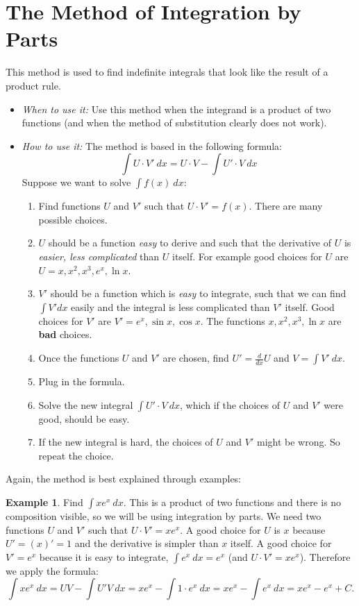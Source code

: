 \documentclass[12pt]{article}
\theoremstyle{definition}
\newtheorem{exa}[thm]{Example}
\begin{document}
\section*{The Method of Integration by Parts}

This method is used to find indefinite integrals that look like the result of a product rule.

\begin{itemize}
\item {\it When to use it:} Use this method when the integrand is a product of two functions (and when the method of
substitution clearly does not work).

\item {\it How to use it:} The method is based in the following formula:
$$\int U\cdot V' \ dx = U \cdot V - \int U' \cdot V \ dx $$
Suppose we want to solve $\int f(x) \ dx$:
\begin{enumerate}
\item Find functions $U$ and $V'$ such that $U\cdot V' = f(x)$. There are many possible choices.
\item $U$ should be a function {\it easy} to derive and such that the derivative of $U$ is {\it easier, less complicated}
than $U$ itself. For example good choices for $U$ are $U=x, x^2, x^3, e^x,\ln x$.
\item $V'$ should be a function which is {\it easy} to integrate, such that we can find $\int V' dx$ easily and the integral
is less complicated than $V'$ itself. Good choices
for $V'$ are $V'=e^x, \sin x, \cos x$. The functions $x, x^2, x^3 , \ln x$ are {\bf bad} choices.
\item Once the functions $U$ and $V'$ are chosen, find $U' =\frac{d}{dx}U$ and $V=\int V' \ dx$.
\item Plug in the formula.
\item Solve the new integral $\int U' \cdot V \ dx$, which if the choices of $U$ and $V'$ were good, should be easy.
\item If the new integral is hard, the choices of $U$ and $V'$ might be wrong. So repeat the choice.
\end{enumerate}
\end{itemize}

Again, the method is best explained through examples:

\begin{exa}
Find $\int xe^x \ dx$. This is a product of two functions and there is no composition visible, so we will be using
integration by parts. We need two functions $U$ and $V'$ such that $U\cdot V' = xe^x$. A good choice for $U$ is $x$ because
$U'=(x)'=1$ and the derivative is simpler than $x$ itself. A good choice for $V'=e^x$ because it is easy to integrate,
$\int e^x \ dx = e^x $ (and $U \cdot V'=xe^x$). Therefore we apply the formula:
$$\int xe^x \ dx = UV-\int U'V \ dx= xe^x-\int 1\cdot e^x \ dx = xe^x -\int e^x \ dx = xe^x - e^x + C.$$
\end{exa}
\end{document}
